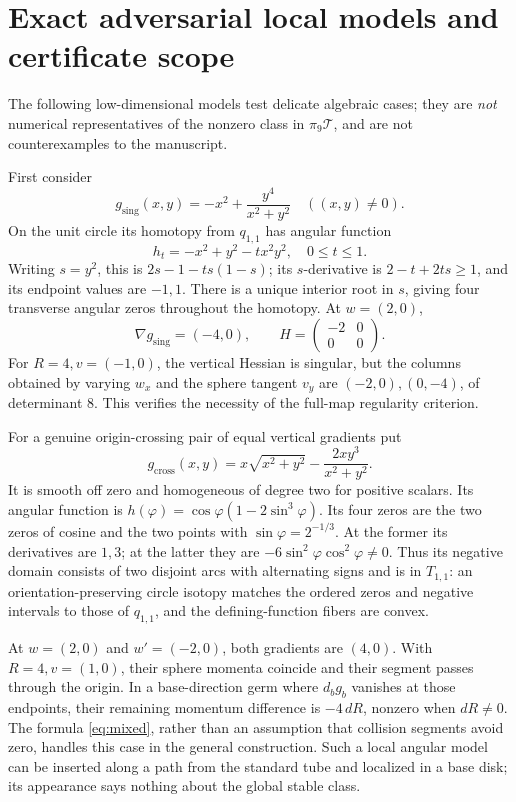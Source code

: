 \documentclass[11pt]{article}
\theoremstyle{remark}
\newcommand{\T}{\mathcal T}
\begin{document}
\section{Exact adversarial local models and certificate scope}
The following low-dimensional models test delicate algebraic cases;
they are \emph{not} numerical representatives of the nonzero class
in \(\pi_9\T\), and are not counterexamples to the manuscript.

First consider
\[
 g_{\mathrm{sing}}(x,y)=-x^2+\frac{y^4}{x^2+y^2}\quad ((x,y)\ne0).
\]
On the unit circle its homotopy from \(q_{1,1}\) has angular
function
\[
 h_t=-x^2+y^2-tx^2y^2,\quad 0\leq t\leq1.
\]
Writing \(s=y^2\), this is \(2s-1-ts(1-s)\); its \(s\)-derivative
is \(2-t+2ts\geq1\), and its endpoint values are \(-1,1\).
There is a unique interior root in \(s\), giving four transverse
angular zeros throughout the homotopy. At \(w=(2,0)\),
\[
 \nabla g_{\mathrm{sing}}=(-4,0),\qquad
 H=\begin{pmatrix}-2&0\\0&0\end{pmatrix}.
\]
For \(R=4,v=(-1,0)\), the vertical Hessian is singular, but the
columns obtained by varying \(w_x\) and the sphere tangent \(v_y\)
are \((-2,0),(0,-4)\), of determinant \(8\).
This verifies the necessity of the full-map regularity criterion.

For a genuine origin-crossing pair of equal vertical gradients put
\[
 g_{\mathrm{cross}}(x,y)=x\sqrt{x^2+y^2}
                       -\frac{2xy^3}{x^2+y^2}.
\]
It is smooth off zero and homogeneous of degree two for positive
scalars. Its angular function is
\(h(\varphi)=\cos\varphi(1-2\sin^3\varphi)\).
Its four zeros are the two zeros of cosine and the two points
with \(\sin\varphi=2^{-1/3}\). At the former its derivatives are
\(1,3\); at the latter they are
\(-6\sin^2\varphi\cos^2\varphi\ne0\).
Thus its negative domain consists of two disjoint arcs with
alternating signs and is in \(T_{1,1}\): an orientation-preserving
circle isotopy matches the ordered zeros and negative intervals
to those of \(q_{1,1}\), and the defining-function fibers are convex.

At \(w=(2,0)\) and \(w'=(-2,0)\), both gradients are \((4,0)\).
With \(R=4,v=(1,0)\), their sphere momenta coincide and their
segment passes through the origin. In a base-direction germ where
\(d_bg_b\) vanishes at those endpoints, their remaining momentum
difference is \(-4\,dR\), nonzero when \(dR\ne0\).
The formula \eqref{eq:mixed}, rather than an assumption that
collision segments avoid zero, handles this case in the general
construction. Such a local angular model can be inserted along a
path from the standard tube and localized in a base disk; its
appearance says nothing about the global stable class.
\end{document}
